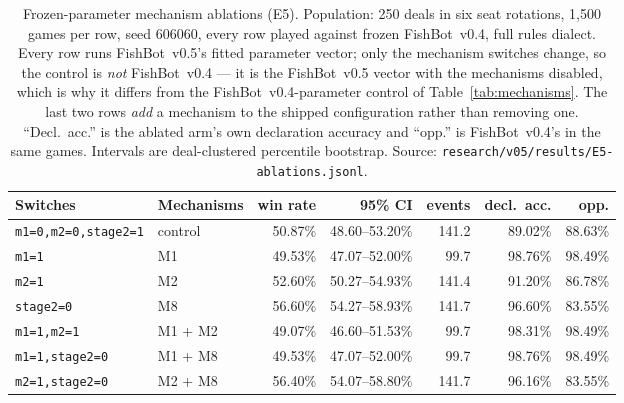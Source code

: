 \documentclass[11pt]{article}
\theoremstyle{definition}
\DeclareRobustCommand{\vfive}{\texorpdfstring{\mbox{FishBot v0.5}}{FishBot v0.5}}
\DeclareRobustCommand{\vfour}{\texorpdfstring{\mbox{FishBot v0.4}}{FishBot v0.4}}
\providecommand{\numAblFiveSeed}{606060}
\providecommand{\numAblControl}{50.87}
\providecommand{\numAblControlCI}{48.60--53.20}
\providecommand{\numAblControlDeclAcc}{89.02}
\providecommand{\numAblControlEvents}{141.2}
\providecommand{\numAblControlOppDeclAcc}{88.63}
\providecommand{\numAblFiveDeals}{250}
\providecommand{\numAblFiveGames}{1{,}500}
\providecommand{\numAblMeight}{56.60}
\providecommand{\numAblMeightCI}{54.27--58.93}
\providecommand{\numAblMeightDeclAcc}{96.60}
\providecommand{\numAblMeightEvents}{141.7}
\providecommand{\numAblMeightOppDeclAcc}{83.55}
\providecommand{\numAblMone}{49.53}
\providecommand{\numAblMoneCI}{47.07--52.00}
\providecommand{\numAblMoneDeclAcc}{98.76}
\providecommand{\numAblMoneEvents}{99.7}
\providecommand{\numAblMoneMeight}{49.53}
\providecommand{\numAblMoneMeightCI}{47.07--52.00}
\providecommand{\numAblMoneMeightDeclAcc}{98.76}
\providecommand{\numAblMoneMeightEvents}{99.7}
\providecommand{\numAblMoneMeightOppDeclAcc}{98.49}
\providecommand{\numAblMoneMtwo}{49.07}
\providecommand{\numAblMoneMtwoCI}{46.60--51.53}
\providecommand{\numAblMoneMtwoDeclAcc}{98.31}
\providecommand{\numAblMoneMtwoEvents}{99.7}
\providecommand{\numAblMoneMtwoOppDeclAcc}{98.49}
\providecommand{\numAblMoneOppDeclAcc}{98.49}
\providecommand{\numAblMtwo}{52.60}
\providecommand{\numAblMtwoCI}{50.27--54.93}
\providecommand{\numAblMtwoDeclAcc}{91.20}
\providecommand{\numAblMtwoEvents}{141.4}
\providecommand{\numAblMtwoMeight}{56.40}
\providecommand{\numAblMtwoMeightCI}{54.07--58.80}
\providecommand{\numAblMtwoMeightDeclAcc}{96.16}
\providecommand{\numAblMtwoMeightEvents}{141.7}
\providecommand{\numAblMtwoMeightOppDeclAcc}{83.55}
\providecommand{\numAblMtwoOppDeclAcc}{86.78}
\begin{document}
\begin{table}[t]
\centering
\caption{Frozen-parameter mechanism ablations (E5). Population:
\numAblFiveDeals{} deals in six seat rotations, \numAblFiveGames{} games per row,
seed \numAblFiveSeed{}, every row played against frozen \vfour{}, full rules
dialect. Every row runs \vfive{}'s fitted parameter vector; only the mechanism
switches change, so the control is \emph{not} \vfour{} --- it is the \vfive{}
vector with the mechanisms disabled, which is why it differs from the
\vfour{}-parameter control of Table~\ref{tab:mechanisms}. The last two rows
\emph{add} a mechanism to the shipped configuration rather than removing one.
``Decl.\ acc.'' is the ablated arm's own declaration accuracy and ``opp.'' is
\vfour{}'s in the same games. Intervals are deal-clustered percentile bootstrap.
Source: \texttt{research/v05/results/E5-ablations.jsonl}.}
\label{tab:ablations-v05}
\footnotesize
\begin{tabular}{llrrrrr}
\toprule
\textbf{Switches} & \textbf{Mechanisms} & \textbf{win rate} & \textbf{95\% CI}
  & \textbf{events} & \textbf{decl.\ acc.} & \textbf{opp.} \\
\midrule
\texttt{m1=0,m2=0,stage2=1} & control          & \numAblControl\%    & \numAblControlCI\%    & \numAblControlEvents{}    & \numAblControlDeclAcc\%    & \numAblControlOppDeclAcc\% \\
\texttt{m1=1}               & M1               & \numAblMone\%       & \numAblMoneCI\%       & \numAblMoneEvents{}       & \numAblMoneDeclAcc\%       & \numAblMoneOppDeclAcc\% \\
\texttt{m2=1}               & M2               & \numAblMtwo\%       & \numAblMtwoCI\%       & \numAblMtwoEvents{}       & \numAblMtwoDeclAcc\%       & \numAblMtwoOppDeclAcc\% \\
\texttt{stage2=0}           & M8               & \numAblMeight\%     & \numAblMeightCI\%     & \numAblMeightEvents{}     & \numAblMeightDeclAcc\%     & \numAblMeightOppDeclAcc\% \\
\texttt{m1=1,m2=1}          & M1 + M2          & \numAblMoneMtwo\%   & \numAblMoneMtwoCI\%   & \numAblMoneMtwoEvents{}   & \numAblMoneMtwoDeclAcc\%   & \numAblMoneMtwoOppDeclAcc\% \\
\texttt{m1=1,stage2=0}      & M1 + M8          & \numAblMoneMeight\% & \numAblMoneMeightCI\% & \numAblMoneMeightEvents{} & \numAblMoneMeightDeclAcc\% & \numAblMoneMeightOppDeclAcc\% \\
\texttt{m2=1,stage2=0}      & M2 + M8          & \numAblMtwoMeight\% & \numAblMtwoMeightCI\% & \numAblMtwoMeightEvents{} & \numAblMtwoMeightDeclAcc\% & \numAblMtwoMeightOppDeclAcc\% \\

\end{tabular}
\end{table}
\end{document}

